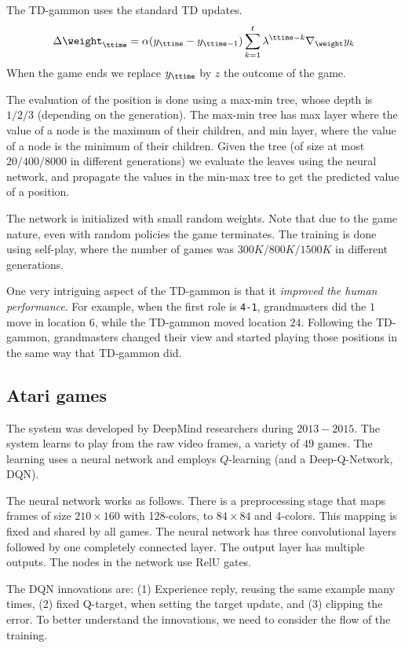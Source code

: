 The TD-gammon uses the standard TD updates.
\[
\Delta \weight_\ttime =
\alpha(y_\ttime-y_{\ttime-1})\sum_{k=1}^{t}\lambda^{\ttime-k}\nabla_\weight
y_k
\]
When the game ends we replace $y_\ttime$ by $z$ the outcome of the
game.



The evaluation of the position is done using a max-min tree, whose
depth is $1/2/3$ (depending on the generation). The max-min tree has max layer where the value of
a node is the maximum of their children, and min layer, where the
value of a node is the minimum of their children. Given the tree (of
size at most $20/400/8000$ in different generations) we evaluate the
leaves using the neural network, and propagate the values in the
min-max tree to get the predicted value of a position.

The network is initialized with small random weights. Note that due
to the game nature, even with random policies the game terminates.
The training is done using self-play, where the number of games was
$300K/800K/1500K$ in different generations.

One very intriguing aspect  of the TD-gammon is that it {\em
improved the human performance}. For example, when the first role is
{\tt 4-1}, grandmasters did the $1$ move in location $6$, while the
TD-gammon moved location $24$. Following the TD-gammon, grandmasters
changed their view and started playing those positions in the same
way that TD-gammon did.

\subsection{Atari games}

The system was developed by DeepMind researchers during $2013-2015$.
The system learns to play from the raw video frames, a variety of
$49$ games. The learning uses a neural network and employs
$Q$-learning (and a Deep-Q-Network, DQN).

The neural network works as follows. There is a preprocessing stage
that maps frames of size $210\times 160$ with 128-colors, to
$84\times 84$ and 4-colors. This mapping is fixed and shared by all
games. The neural network has three convolutional layers followed by
one completely connected layer. The output layer has multiple
outputs. The nodes in the network use RelU gates.

The DQN innovations are: (1) Experience reply, reusing the same
example many times, (2) fixed Q-target, when setting the target
update, and (3) clipping the error. To better understand the
innovations, we need to consider the flow of the training.

